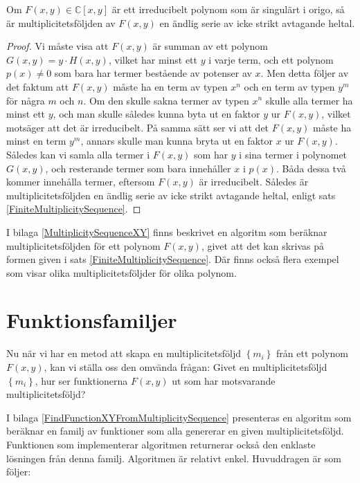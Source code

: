 \begin{Corollary}
Om $F(x,y)\in \mathbb{C}[x,y]$ är ett irreducibelt polynom som är singulärt i origo, så är multiplicitetsföljden av $F(x,y)$ en ändlig serie av icke strikt avtagande heltal.
\end{Corollary}

\begin{proof}
Vi måste visa att $F(x,y)$ är summan av ett polynom $G(x,y)=y\cdot H(x,y)$, vilket har minst ett $y$ i varje term, och ett polynom $p(x) \neq 0$ som bara har termer bestående av potenser av $x$. Men detta följer av det faktum att $F(x,y)$ måste ha en term av typen $x^n$ och en term av typen $y^m$ för några $m$ och $n$. Om den skulle sakna termer av typen $x^n$ skulle alla termer ha minst ett $y$, och man skulle således kunna byta ut en faktor $y$ ur $F(x,y)$, vilket motsäger att det är irreducibelt. På samma sätt ser vi att det $F(x,y)$ måste ha minst en term $y^m$, annars skulle man kunna bryta ut en faktor $x$ ur $F(x,y)$. Således kan vi samla alla termer i $F(x,y)$ som har $y$ i sina termer i polynomet $G(x,y)$, och resterande termer som bara innehåller $x$ i $p(x)$. Båda dessa två kommer innehålla termer, eftersom $F(x,y)$ är irreducibelt. Således är multiplicitetsföljden en ändlig serie av icke strikt avtagande heltal, enligt sats \ref{FiniteMultiplicitySequence}.
\end{proof}

I bilaga \ref{MultiplicitySequenceXY} finns beskrivet en algoritm som beräknar multiplicitetsföljden för ett polynom $F(x,y)$, givet att det kan skrivas på formen given i sats \ref{FiniteMultiplicitySequence}. Där finns också flera exempel som visar olika multiplicitetsföljder för olika polynom.

\section{Funktionsfamiljer}

Nu när vi har en metod att skapa en multiplicitetsföljd $\left\{m_i\right\}$ från ett polynom $F(x,y)$, kan vi ställa oss den omvända frågan: Givet en multiplicitetsföljd $\left\{m_i\right\}$, hur ser funktionerna $F(x,y)$ ut som har motsvarande multiplicitetsföljd?

I bilaga \ref{FindFunctionXYFromMultiplicitySequence} presenteras en algoritm som beräknar en familj av funktioner som alla genererar en given multiplicitetsföljd. Funktionen som implementerar algoritmen returnerar också den enklaste lösningen från denna familj. Algoritmen är relativt enkel. Huvuddragen är som följer:

